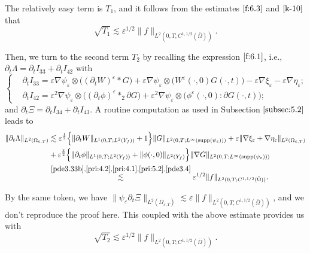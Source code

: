 \documentclass[13pt,CJK]{article}
\theoremstyle{plain}                       %
\theoremstyle{remark}
\numberwithin{equation}{section}
\begin{document}
The relatively easy term is $T_1$, and it follows from the estimates
$\eqref{f:6.3}$ and $\eqref{k-10}$ that
\begin{equation}\label{f:6.5}
 \sqrt{T_1} \lesssim \varepsilon^{1/2}\|f\|_{L^2(0,T;C^{1,1/2}(\bar\Omega))}.
\end{equation}

Then, we turn to the second term $T_2$ by recalling the expression
$\eqref{f:6.1}$, i.e., $\partial_t \Lambda
= \partial_t I_{33} + \partial_t I_{42} $ with
\begin{equation*}
\left\{\begin{aligned}
&\partial_t I_{33}
= \varepsilon\nabla\psi_\varepsilon\otimes
\big((\partial_t W)^\varepsilon\ast G\big)
+ \varepsilon\nabla\psi_\varepsilon\otimes
\big(W^\varepsilon(\cdot,0)G(\cdot,t)\big)
-\varepsilon\nabla\xi_\varepsilon-\varepsilon\nabla\eta_\varepsilon;\\
&\partial_t I_{42}
= \varepsilon^2\nabla\psi_\varepsilon\otimes
\big((\partial_t\phi)^\varepsilon\ast_2\partial G\big)
+ \varepsilon^2\nabla\psi_\varepsilon\otimes
\big(\phi^\varepsilon(\cdot,0):\partial G(\cdot,t)\big);
\end{aligned}\right.
\end{equation*}
and $\partial_t\Xi = \partial_t I_{34}+\partial_tI_{43}$.
A routine computation as used in Subsection $\ref{subsec:5.2}$ leads to
\begin{equation*}
\begin{aligned}
\|\partial_t \Lambda\|_{L^2(\Omega_{\varepsilon,T})}
&\lesssim \varepsilon^{\frac{1}{2}}
\Big\{\|\partial_t W\|_{L^1(0,T;L^2(Y_f))}+1\Big\}
\|G\|_{L^2(0,T;L^\infty(\text{supp}(\psi_\varepsilon)))}
+\varepsilon\|\nabla\xi_\varepsilon
+\nabla\eta_\varepsilon\|_{L^2(\Omega_{\varepsilon,T})}\\
&+\varepsilon^{\frac{3}{2}}
\Big\{\|\partial_t \phi\|_{L^1(0,T;L^2(Y_f))}+\|\phi(\cdot,0)\|_{L^2(Y_f)}\Big\}
\|\nabla G\|_{L^2(0,T;L^\infty(\text{supp}(\psi_\varepsilon)))} \\
&\overset{\eqref{pde3.33b},\eqref{pri:4.2},\eqref{pri:4.1},
\eqref{pri:5.2},\eqref{pde3.4}}{\lesssim} \varepsilon^{1/2}\|f\|_{L^2(0,T;C^{1,1/2}(\bar\Omega))}.
\end{aligned}
\end{equation*}

By the same token, we have $\|\psi_\varepsilon\partial_t
\Xi\|_{L^2(\Omega_{\varepsilon,T})}
\lesssim \varepsilon \|f\|_{L^2(0,T;C^{1,1/2}(\bar\Omega))}$, and
we don't reproduce the proof here.
This coupled with the above estimate provides us with
\begin{equation}\label{f:6.6}
\sqrt{T_2} \lesssim \varepsilon^{1/2}\|f\|_{L^2(0,T;C^{1,1/2}(\bar\Omega))}.
\end{equation}
\end{document}
